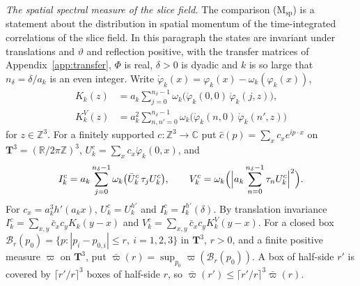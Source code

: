 \documentclass[aps,prd,twocolumn,superscriptaddress,nofootinbib,longbibliography,floatfix,amsmath,amssymb,10pt]{revtex4-2}
\theoremstyle{definition}
\theoremstyle{remark}
\newcommand{\R}{\mathbb{R}}
\newcommand{\Z}{\mathbb{Z}}
\newcommand{\C}{\mathbb{C}}
\begin{document}
\emph{The spatial spectral measure of the slice field.} The comparison
(M$_{\mathrm{sp}}$) is a statement about the distribution in spatial
momentum of the time-integrated correlations of the slice field. In this
paragraph the states are invariant under translations and $\vartheta$ and
reflection positive, with the transfer matrices of
Appendix~\ref{app:transfer}, $\Phi$ is real, $\delta>0$ is dyadic and $k$ is
so large that $n_\delta=\delta/a_k$ is an even integer. Write
$\mathring\varphi_k(x)=\varphi_k(x)-\omega_k(\varphi_k(x))$,
\[
\begin{split}
K_k(z)&=a_k\sum_{j=0}^{n_\delta-1}\omega_k\bigl(\mathring\varphi_k(0,0)\,
\mathring\varphi_k(j,z)\bigr),\\
K^V_k(z)&=a_k^2\sum_{n,n'=0}^{n_\delta-1}\omega_k\bigl(\mathring\varphi_k(n,0)\,
\mathring\varphi_k(n',z)\bigr)
\end{split}
\]
for $z\in\Z^3$. For a finitely supported $c:\Z^3\to\C$ put $\hat c(p)=
\sum_xc_xe^{ip\cdot x}$ on $\mathbf T^3=(\R/2\pi\Z)^3$,
$U^c_k=\sum_xc_x\mathring\varphi_k(0,x)$, and
\[
I^c_k=a_k\sum_{j=0}^{n_\delta-1}\omega_k\bigl(\bar U^c_k\,\tau_jU^c_k\bigr),
\qquad V^c_k=\omega_k\Bigl(\Bigl|a_k\sum_{n=0}^{n_\delta-1}\tau_nU^c_k
\Bigr|^2\Bigr).
\]
For $c_x=a_k^3h'(a_kx)$, $U^c_k=U^{h'}_k$ and $I^c_k=I^{h'}_k(\delta)$. By
translation invariance $I^c_k=\sum_{x,y}\bar c_xc_yK_k(y-x)$ and $V^c_k=
\sum_{x,y}\bar c_xc_yK^V_k(y-x)$. For a closed box $\mathcal B_r(p_0)=
\{p:|p_i-p_{0,i}|\le r,\ i=1,2,3\}$ in $\mathbf T^3$, $r>0$, and a finite
positive measure $\varpi$ on $\mathbf T^3$, put $\bar\varpi(r)=\sup_{p_0}
\varpi(\mathcal B_r(p_0))$. A box of half-side $r'$ is covered by
$\lceil r'/r\rceil^3$ boxes of half-side $r$, so $\bar\varpi(r')\le\lceil
r'/r\rceil^3\bar\varpi(r)$.
\end{document}
